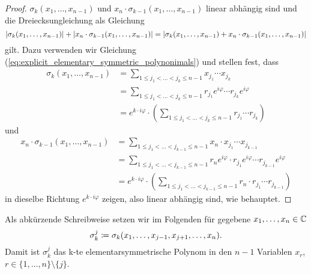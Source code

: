 \begin{proof}
    $\sigma_{k}(x_1, \dots, x_{n-1})$ und $x_n \cdot \sigma_{k-1}(x_1, \dots, x_{n-1})$
    linear abhängig sind und die Dreiecksungleichung als Gleichung
    \[
        \left\lvert \sigma_{k}(x_1, \dots, x_{n-1}) \right\rvert + \left\lvert x_n \cdot \sigma_{k-1}(x_1, \dots, x_{n-1}) \right\rvert
        = \left\lvert \sigma_{k}(x_1, \dots, x_{n-1}) + x_n \cdot \sigma_{k-1}(x_1, \dots, x_{n-1}) \right\rvert
    \]
    gilt.
    Dazu verwenden wir Gleichung
    (\ref{eq:explicit_elementary_symmetric_polynonimals}) und stellen fest, dass
    \begin{equation*}
        \begin{split}
            \sigma_{k}(x_1, \dots, x_{n-1})
            &= \sum_{1 \leq j_1 < \dots < j_k \leq n-1} x_{j_1} \cdots x_{j_k}\\
            &= \sum_{1 \leq j_1 < \dots < j_k \leq n-1} r_{j_1} e^{i\varphi} \cdots r_{j_k} e^{i\varphi}\\
            &= e^{k\cdot i\varphi} \cdot \left( \sum_{1 \leq j_1 < \dots < j_k \leq n-1} r_{j_1} \cdots r_{j_k} \right)
        \end{split}
    \end{equation*}
    und
    \begin{equation*}
        \begin{split}
            x_n \cdot \sigma_{k-1}(x_1, \dots, x_{n-1})
            &= \sum_{1 \leq j_1 < \dots < j_{k-1} \leq n-1} x_n \cdot x_{j_1} \cdots x_{j_{k-1}}\\
            &= \sum_{1 \leq j_1 < \dots < j_{k-1} \leq n-1} r_n e^{i\varphi} \cdot r_{j_1} e^{i\varphi} \cdots r_{j_{k-1}} e^{i\varphi}\\
            &= e^{k\cdot i\varphi} \cdot \left( \sum_{1 \leq j_1 < \dots < j_{k-1} \leq n-1} r_n \cdot r_{j_1} \cdots r_{j_{k-1}} \right)
        \end{split}
    \end{equation*}
    in dieselbe Richtung $e^{k\cdot i\varphi}$ zeigen, also linear abhängig sind, wie behauptet.
\end{proof}

\begin{notation}
    Als abkürzende Schreibweise setzen wir im Folgenden für gegebene $x_1, \dots, x_{n} \in \mathbb{C}$
    \[
        \sigma_{k}^{j} \coloneqq \sigma_{k}(x_1, \dots, x_{j-1}, x_{j+1}, \dots, x_{n}).
    \]
    Damit ist $\sigma_{k}^{j}$ das k-te elementarsymmetrische Polynom in den
    $n-1$ Variablen $x_r$, $r \in \{ 1, \dots, n \} \setminus \{ j \}$.
\end{notation}

